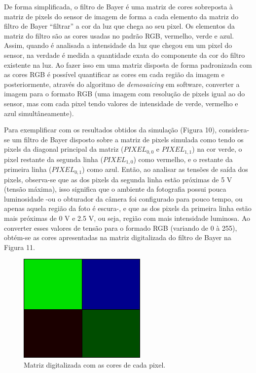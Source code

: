 \documentclass[10pt,a4paper,twocolumn]{article}
\begin{document}
	 De forma simplificada, o filtro de Bayer é uma matriz de cores sobreposta à matriz de pixels do sensor de imagem de forma a cada elemento da matriz do filtro de Bayer ``filtrar'' a cor da luz que chega ao seu pixel. Os elementos da matriz do filtro são as cores usadas no padrão RGB, vermelho, verde e azul. Assim, quando é analisada a intensidade da luz que chegou em um pixel do sensor, na verdade é medida a quantidade exata do componente da cor do filtro existente na luz. Ao fazer isso em uma matriz disposta de forma padronizada com as cores RGB é possível quantificar as cores em cada região da imagem e posteriormente, através do algoritmo de \textit{demosaicing} em software, converter a imagem para o formato RGB (uma imagem com resolução de pixels igual ao do sensor, mas com cada pixel tendo valores de intensidade de verde, vermelho e azul simultâneamente).
	 
	 Para exemplificar com os resultados obtidos da simulação (Figura 10), considera-se um filtro de Bayer disposto sobre a matriz de pixels simulada como tendo os pixels da diagonal principal da matriz ($PIXEL_{0,0}$ e $PIXEL_{1,1}$) na cor verde, o pixel restante da segunda linha ($PIXEL_{1,0}$) como vermelho, e o restante da primeira linha ($PIXEL_{0,1}$) como azul. Então, ao analisar as tensões de saída dos pixels, observa-se que as dos pixels da segunda linha estão  próximas de 5 V (tensão máxima), isso significa que o ambiente da fotografia possui pouca luminosidade -ou o obturador da câmera foi configurado para pouco tempo, ou apenas aquela região da foto é escura-, e que as dos pixels da primeira linha estão mais próximas de 0 V e 2.5 V, ou seja, região com mais intensidade luminosa. Ao converter esses valores de tensão para o formado RGB (variando de 0 à 255), obtém-se as cores apresentadas na matriz digitalizada do filtro de Bayer na Figura 11.
	 
 	\begin{figure}[!h]
 	\centering
 	\includegraphics[scale=0.4]{imagens/filtro_bayer.png}
 	\caption{Matriz digitalizada com as cores de cada pixel.}
	 \end{figure}
	 
\end{document}

